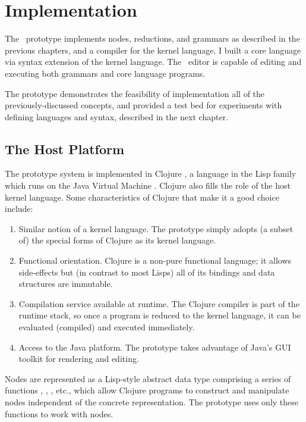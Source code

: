 \chapter{Implementation}
\label{prototype}

The \Meta\ prototype implements nodes, reductions, and grammars as described in the previous chapters, and a compiler for the kernel language. I built a core language via syntax extension of the kernel language. The \Meta\ editor is capable of editing and executing both grammars and core language programs.

The prototype demonstrates the feasibility of implementation all of the previously-discussed concepts, and provided a test bed for experiments with defining languages and syntax, described in the next chapter.


\section{The Host Platform}
The prototype system is implemented in Clojure \cite{clojure}, a language in the Lisp family which runs on the Java Virtual Machine \cite{jvm}. Clojure also fills the role of the host kernel language. Some characteristics of Clojure that make it a good choice include:
\begin{enumerate}
\item Similar notion of a kernel language. The prototype simply adopts (a subset of) the special forms of Clojure as its kernel language.
\item Functional orientation. Clojure is a non-pure functional language; it allows side-effects but (in contrast to most Lisps) all of its bindings and data structures are immutable.
\item Compilation service available at runtime. The Clojure compiler is part of the runtime stack, so once a program is reduced to the kernel language, it can be evaluated (compiled) and executed immediately.
\item Access to the Java platform. The prototype takes advantage of Java's GUI toolkit for rendering and editing.
\end{enumerate}

Nodes are represented as a Lisp-style abstract data type comprising a series of functions , , , etc., which allow Clojure programs to construct and manipulate nodes independent of the concrete representation. The prototype uses only these functions to work with nodes.


